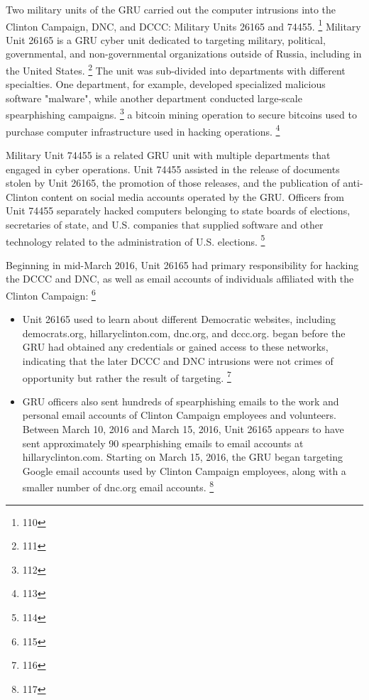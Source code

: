 Two military units of the GRU carried out the computer intrusions into the Clinton Campaign, DNC, and DCCC: Military Units 26165 and 74455.%
\footnote{110}
Military Unit 26165 is a GRU cyber unit dedicated to targeting military, political, governmental, and non-governmental organizations outside of Russia, including in the United States.%
\footnote{111}
The unit was sub-divided into departments with different specialties.
One department, for example, developed specialized malicious software "malware", while another department conducted large-scale spearphishing campaigns.%
\footnote{112}
 a bitcoin mining operation to secure bitcoins used to purchase computer infrastructure used in hacking operations.%
\footnote{113}

Military Unit 74455 is a related GRU unit with multiple departments that engaged in cyber operations.
Unit 74455 assisted in the release of documents stolen by Unit 26165, the promotion of those releases, and the publication of anti-Clinton content on social media accounts operated by the GRU.
Officers from Unit 74455 separately hacked computers belonging to state boards of elections, secretaries of state, and U.S. companies that supplied software and other technology related to the administration of U.S. elections.%
\footnote{114}

Beginning in mid-March 2016, Unit 26165 had primary responsibility for hacking the DCCC and DNC, as well as email accounts of individuals affiliated with the Clinton Campaign:%
\footnote{115}

\begin{itemize}
    \item Unit 26165 used  to learn about  different Democratic websites, including democrats.org, hillaryclinton.com, dnc.org, and dccc.org.
     began before the GRU had obtained any credentials or gained access to these networks,  indicating that the later DCCC and DNC intrusions were not crimes of opportunity but rather the result of targeting.%
    \footnote{116}
    \item GRU officers also sent hundreds of spearphishing emails to the work and personal email accounts of Clinton Campaign employees and volunteers.
    Between March 10, 2016 and March 15, 2016, Unit 26165 appears to have sent approximately 90 spearphishing emails to email accounts at hillaryclinton.com.
    Starting on March 15, 2016, the GRU began targeting Google email accounts used by Clinton Campaign employees, along with a smaller number of dnc.org email accounts.%
    \footnote{117}
\end{itemize}

